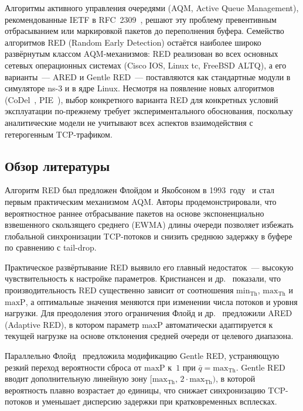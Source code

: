 \documentclass[12pt,a4paper]{article}
\begin{document}
Алгоритмы активного управления очередями (AQM, Active Queue Management), рекомендованные IETF в RFC~2309~\cite{rfc2309}, решают эту проблему превентивным отбрасыванием или маркировкой пакетов до переполнения буфера. Семейство алгоритмов RED (Random Early Detection) остаётся наиболее широко развёрнутым классом AQM-механизмов: RED реализован во всех основных сетевых операционных системах (Cisco IOS, Linux tc, FreeBSD ALTQ), а его варианты~--- ARED и Gentle RED~--- поставляются как стандартные модули в симуляторе ns-3 и в ядре Linux. Несмотря на появление новых алгоритмов (CoDel~\cite{nichols2012}, PIE~\cite{pan2013}), выбор конкретного варианта RED для конкретных условий эксплуатации по-прежнему требует экспериментального обоснования, поскольку аналитические модели не учитывают всех аспектов взаимодействия с гетерогенным TCP-трафиком.

\subsection{Обзор литературы}

Алгоритм RED был предложен Флойдом и Якобсоном в 1993~году~\cite{floyd1993} и стал первым практическим механизмом AQM. Авторы продемонстрировали, что вероятностное раннее отбрасывание пакетов на основе экспоненциально взвешенного скользящего среднего (EWMA) длины очереди позволяет избежать глобальной синхронизации TCP-потоков и снизить среднюю задержку в буфере по сравнению с tail-drop.

Практическое развёртывание RED выявило его главный недостаток~--- высокую чувствительность к настройке параметров. Кристиансен и др.~\cite{christiansen2001} показали, что производительность RED существенно зависит от соотношения $\mathrm{min}_{\mathrm{Th}}$, $\mathrm{max}_{\mathrm{Th}}$ и $\mathrm{maxP}$, а оптимальные значения меняются при изменении числа потоков и уровня нагрузки. Для преодоления этого ограничения Флойд и др.~\cite{floyd2001} предложили ARED (Adaptive RED), в котором параметр $\mathrm{maxP}$ автоматически адаптируется к текущей нагрузке на основе отклонения средней очереди от целевого диапазона.

Параллельно Флойд~\cite{floyd2000} предложила модификацию Gentle RED, устраняющую резкий переход вероятности сброса от $\mathrm{maxP}$ к~$1$ при $\bar{q} = \mathrm{max}_{\mathrm{Th}}$. Gentle RED вводит дополнительную линейную зону $[\mathrm{max}_{\mathrm{Th}},\, 2\cdot\mathrm{max}_{\mathrm{Th}})$, в которой вероятность плавно возрастает до единицы, что снижает синхронизацию TCP-потоков и уменьшает дисперсию задержки при кратковременных всплесках.
\end{document}

